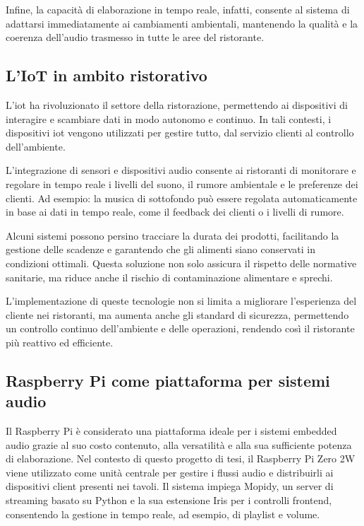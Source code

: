 Infine, la capacità di elaborazione in tempo reale, infatti, consente al sistema di adattarsi immediatamente ai cambiamenti ambientali, mantenendo la qualità e la coerenza dell’audio trasmesso in tutte le aree del ristorante.

\newpage
\subsection{L'IoT in ambito ristorativo}
\noindent

L'\gls{iot} ha rivoluzionato il settore della ristorazione, permettendo ai dispositivi di interagire e scambiare dati in modo autonomo e continuo. In tali contesti, i dispositivi \gls{iot} vengono utilizzati per gestire tutto, dal servizio clienti al controllo dell'ambiente.

L'integrazione di sensori e dispositivi audio consente ai ristoranti di monitorare e regolare in tempo reale i livelli del suono, il rumore ambientale e le preferenze dei clienti. Ad esempio: la musica di sottofondo può essere regolata automaticamente in base ai dati in tempo reale, come il feedback dei clienti o i livelli di rumore.

Alcuni sistemi possono persino tracciare la durata dei prodotti, facilitando la gestione delle scadenze e garantendo che gli alimenti siano conservati in condizioni ottimali. Questa soluzione non solo assicura il rispetto delle normative sanitarie, ma riduce anche il rischio di contaminazione alimentare e sprechi. \cite{10593159}

L'implementazione di queste tecnologie non si limita a migliorare l'esperienza del cliente nei ristoranti, ma aumenta anche gli standard di sicurezza, permettendo un controllo continuo dell'ambiente e delle operazioni, rendendo così il ristorante più reattivo ed efficiente.
\subsection{Raspberry Pi come piattaforma per sistemi audio}
\noindent

Il Raspberry Pi è considerato una piattaforma ideale per i sistemi embedded audio grazie al suo costo contenuto, alla versatilità e alla sua sufficiente potenza di elaborazione. Nel contesto di questo progetto di tesi, il Raspberry Pi Zero 2W viene utilizzato come unità centrale per gestire i flussi audio e distribuirli ai dispositivi client presenti nei tavoli. Il sistema impiega Mopidy, un server di streaming basato su Python e la sua estensione Iris per i controlli frontend, consentendo la gestione in tempo reale, ad esempio, di playlist e volume.

